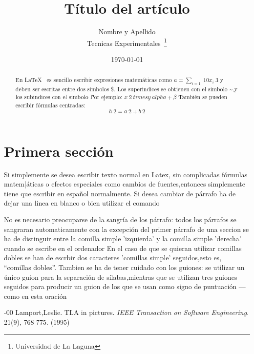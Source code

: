\documentclass[a4paper,12pt]{article}
\begin{document}
\title{Título del artículo}
\author{Nombre y Apellido \\
        Tecnicas Experimentales~\footnote{Universidad de La Laguna}
        }
\date{\today}
\maketitle
\begin{abstract}
  En \LaTeX{}~\cite{Lam:86} es sencillo escribir expresiones
  matemáticas como $a=\sum_{i=1}~{10} {x_i}~{3}$
  y deben ser escritas entre dos simbolos \$.
  Los superindices se obtienen con el simbolo \~{},y
  los subindices con el simbolo \.
  Por ejemplo: $x~2 \ times y~{alpha + \beta}$
  También se pueden escribir fórmulas centradas:
  \[h~2=a~2 + b~2 \]
  \end{abstract}
  
  \section{Primera sección}
 Si simplemente se desea escribir texto normal en Latex,
 sin complicadas f\'ormulas matem|\'aticas o efectos especiales
 como cambios de fuentes,entonces simplemente tiene que escribir
 en espa\~nol normalmente.
 Si desea cambiar de párrafo ha de dejar una línea en blanco o bien 
 utilizar el comando \par
 No es necesario preocuparse de la sangría de los párrafo:
 todos  los párrafos se sangraran automaticamente con la excepción
 del primer párrafo de una seccion
 se ha de distinguir entre la comilla simple 'izquierda'
 y la comilla simple 'derecha' cuando se escribe en el ordenador
 En el caso de que se quieran utilizar comillas dobles se han de 
 escrbir dos caracteres 'comillas simple' seguidos,esto es,
 ``comillas dobles''.
 Tambien se ha de tener cuidado con los guiones: se utilizar un único 
 guion para la separación de sílabas,mientras que se utilizan
 tres guiones seguidos para producir un guion de los que se usan
 como signo de puntuación ---como en esta oración
 \begin{thebibliography}-{00}
   Lamport,Leslie.
   TLA in pictures.
   \emph{IEEE Transaction on Software Engineering}.
   21(9), 768-775.
   (1995)
   \end{thebibliography}
\end{document}
